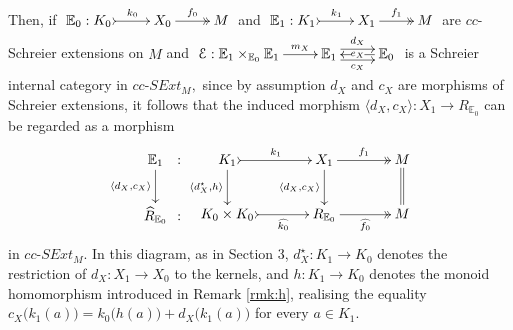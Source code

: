 \documentclass[a4paper]{amsart}
\theoremstyle{plain}
\theoremstyle{definition}
\theoremstyle{remark}
\newcommand{\la}{\langle}
\newcommand{\ra}{\rangle}
\begin{document}
Then, if $\xymatrix{{\mathbb{E}_0:K_0} \ar@{>->}[r]^-{k_0} &{X_0} \ar@{->>}[r]^-{f_0} &{M}}$ and $\xymatrix{{\mathbb{E}_1:K_1} \ar@{>->}[r]^-{k_1} &{X_1} \ar@{->>}[r]^-{f_1} &{M}}$ are $cc$-Schreier extensions on $M$ and $\xymatrix{
{\mathcal{E}:{{\mathbb{E}}_1}\times_{{\mathbb{E}}_0}{{\mathbb{E}}_1}} \ar[r]^-{m_X} &{{\mathbb{E}}_1} \ar@<.9ex>[r]^-{d_X} \ar@<-.9ex>[r]_-{c_X} &{{\mathbb{E}}_0} \ar[l]|-{e_X}
}$ is a Schreier internal category in $cc\text{-}SExt_M,$ since by assumption $d_X$ and $c_X$ are morphisms of Schreier extensions, it follows that the induced morphism $\la d_X,c_X\ra\colon X_1\longrightarrow R_{{\mathbb{E}}_0}$ can be regarded as a morphism
\begin{equation}
\label{eqn:aspherical_in_cc-SExt_M}
\begin{aligned}
{
\xymatrixcolsep{0.1pc}
\xymatrix{
{{\mathbb{E}}_1} \ar[d]_-{\la d_X,c_X \ra} &{:}\\
{\widehat{R}_{{\mathbb{E}}_0}} &{:}
}
}
{
\xymatrixcolsep{3pc}
\xymatrix{
{K_1} \ar[d]_-{\la d^\star_X,h\ra} \ar@{>->}[r]^-{k_1} &{X_1} \ar[d]_-{\la d_X,c_X\ra} \ar@{->>}[r]^-{f_1} &M \ar@{=}[d] \\
{K_0\times K_0} \ar@{>->}[r]_-{\widehat{k_0}} &{R_{{\mathbb{E}}_0}} \ar@{->>}[r]_-{\widehat{f_0}} &{M}
}
}
\end{aligned}
\end{equation}
in $cc\text{-}SExt_M.$ In this diagram, as in Section 3, $d^\star_X\colon K_1\longrightarrow K_0$ denotes the restriction of $d_X\colon X_1\longrightarrow X_0$ to the kernels, and $h\colon K_1\longrightarrow K_0$ denotes the monoid homomorphism introduced in Remark \ref{rmk:h}, realising the equality $c_X\big(k_1(a)\big)=k_0\big(h(a)\big)+d_X\big(k_1(a)\big)$ for every $a\in K_1.$
\end{document}
